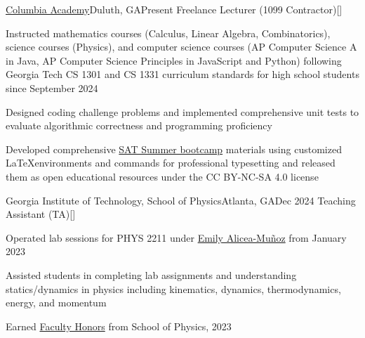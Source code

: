 \begin{resume-itemize}
  {\href{https://www.columbiaacademyga.com/}{Columbia Academy}}{Duluth, GA}{Present}
  {Freelance Lecturer (1099 Contractor)}[\href{https://github.com/JaehoonSong12/columbia_academy}{}]
  \item Instructed mathematics courses (Calculus, Linear Algebra, Combinatorics), 
  science courses (Physics), and computer science courses (AP Computer Science A in Java, 
  AP Computer Science Principles in JavaScript and Python) 
  following Georgia Tech CS 1301 and CS 1331 curriculum standards for high school students since September 2024
  \item Designed coding challenge problems and implemented comprehensive unit tests to evaluate 
  algorithmic correctness and programming proficiency
  \item Developed comprehensive 
  \href{https://github.com/JaehoonSong12/ydjs-publish/tree/main/clba-2025_SUMMER_complete}{SAT Summer bootcamp} 
  materials using customized \LaTeX environments and commands 
  for professional typesetting and released them as open educational resources under the 
  CC BY-NC-SA 4.0 license
\end{resume-itemize}
\begin{resume-itemize}
  {Georgia Institute of Technology, School of Physics}{Atlanta, GA}{Dec 2024}
  {Teaching Assistant (TA)}[\href{https://github.com/YundaeLeeSong/ydjs-references/tree/main/work2412-gt_physics_ta}{}]
  \item Operated lab sessions for PHYS 2211 under 
  \href{https://physics.gatech.edu/user/emily-alicea-munoz}{Emily Alicea-Muñoz} 
  from January 2023
  \item Assisted students in completing lab assignments and understanding 
  statics/dynamics in physics including kinematics, dynamics, thermodynamics, 
  energy, and momentum
  \item Earned \href{https://gatech.meritpages.com/stories/Jaehoon-Song-Earns-Faculty-Honors-at-Georgia-Tech-for-the-Fall-2023-Semester/125669685}{Faculty Honors} from School of Physics, 2023
\end{resume-itemize}
